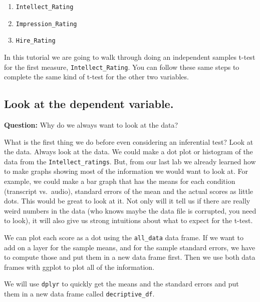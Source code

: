 \documentclass[]{book}
\providecommand{\tightlist}{%
  \setlength{\itemsep}{0pt}\setlength{\parskip}{0pt}}
\theoremstyle{definition}
\theoremstyle{definition}
\theoremstyle{definition}
\theoremstyle{remark}
\begin{document}
\begin{enumerate}
\def\labelenumi{\arabic{enumi}.}
\tightlist
\item
  \texttt{Intellect\_Rating}
\item
  \texttt{Impression\_Rating}
\item
  \texttt{Hire\_Rating}
\end{enumerate}

In this tutorial we are going to walk through doing an independent
samples t-test for the first measure, \texttt{Intellect\_Rating}. You
can follow these same steps to complete the same kind of t-test for the
other two variables.

\subsection{Look at the dependent
variable.}\label{look-at-the-dependent-variable.}

\textbf{Question:} Why do we always want to look at the data?

What is the first thing we do before even considering an inferential
test? Look at the data. Always look at the data. We could make a dot
plot or histogram of the data from the \texttt{Intellect\_ratings}. But,
from our last lab we already learned how to make graphs showing most of
the information we would want to look at. For example, we could make a
bar graph that has the means for each condition (transcript vs.~audio),
standard errors of the mean and the actual scores as little dots. This
would be great to look at it. Not only will it tell us if there are
really weird numbers in the data (who knows maybe the data file is
corrupted, you need to look), it will also give us strong intuitions
about what to expect for the t-test.

We can plot each score as a dot using the \texttt{all\_data} data frame.
If we want to add on a layer for the sample means, and for the sample
standard errors, we have to compute those and put them in a new data
frame first. Then we use both data frames with ggplot to plot all of the
information.

We will use \texttt{dplyr} to quickly get the means and the standard
errors and put them in a new data frame called \texttt{decriptive\_df}.
\end{document}
